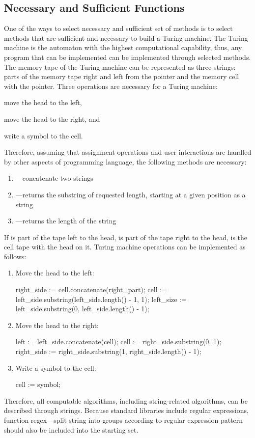 \documentclass[11pt,nonacm,natbib=false]{acmart}
\begin{document}
\subsection{Necessary and Sufficient Functions}
One of the ways to select necessary and sufficient set of methods is to select methods that are sufficient and necessary to build a Turing machine. The Turing machine is the automaton with the highest computational capability, thus, any program that can be implemented can be implemented through selected methods. The memory tape of the Turing machine can be represented as three strings: parts of the memory tape right and left from the pointer and the memory cell with the pointer. Three operations are necessary for a Turing machine: \begin{inparaenum}
 \item move the head to the left, 
 \item move the head to the right, and 
 \item write a symbol to the cell.
 \end{inparaenum}
 Therefore, assuming that assignment operations and user interactions are handled by other aspects of programming language, the following methods are necessary:
\begin{enumerate}
    \item {}---concatenate two strings
    \item {}---returns the substring of requested length, starting at a given position as a string
    \item {}---returns the length of the string
\end{enumerate}
If  is part of the tape left to the head,  is part of the tape right to the head,  is the cell tape with the head on it.
Turing machine operations can be implemented as follows: 
\begin{enumerate}
\item Move the head to the left: 
\begin{ffcode}
right_side := cell.concatenate(right_part);
cell := left_side.substring(left_side.length() - 1, 1);
left_size := left_side.substring(0, left_side.length() - 1);
\end{ffcode}
\item Move the head to the right: 
\begin{ffcode}
left := left_side.concatenate(cell);
cell := right_side.substring(0, 1);
right_side := right_side.substring(1, right_side.length() - 1);
\end{ffcode}
\item Write a symbol to the cell: 
\begin{ffcode}
cell := symbol;
\end{ffcode}
\end{enumerate}
Therefore, all computable algorithms, including string-related algorithms, can be described through strings. Because standard libraries include regular expressions, function regex---split string into groups according to regular expression pattern should also be included into the starting set.
\end{document}
